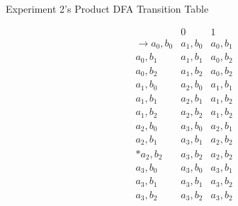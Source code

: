 \documentclass[conference]{IEEEtran}
\begin{document}
\begin{table}[h!]
    \caption{Experiment 2's Product DFA Transition Table}
    \begin{displaymath}
        \begin{array}{r|c|c|}
        & 0 & 1 \\
        \hline
        \rightarrow a_0,b_0 & a_1,b_0 & a_0,b_1 \\
        a_0,b_1 & a_1,b_1 & a_0,b_2 \\
        a_0,b_2 & a_1,b_2 & a_0,b_2 \\
        a_1,b_0 & a_2,b_0 & a_1,b_1 \\
        a_1,b_1 & a_2,b_1 & a_1,b_2 \\
        a_1,b_2 & a_2,b_2 & a_1,b_2 \\
        a_2,b_0 & a_3,b_0 & a_2,b_1 \\
        a_2,b_1 & a_3,b_1 & a_2,b_2 \\
        * a_2,b_2 & a_3,b_2 & a_2,b_2 \\
        a_3,b_0 & a_3,b_0 & a_3,b_1 \\
        a_3,b_1 & a_3,b_1 & a_3,b_2 \\
        a_3,b_2 & a_3,b_2 & a_3,b_2 \\
        \end{array}
    \end{displaymath}
    \label{table-exp2-dfaprod}
\end{table}
\end{document}
